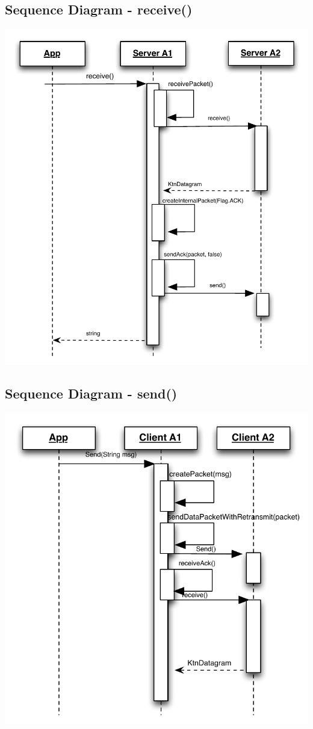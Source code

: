 \documentclass{article}
\begin{document}
\subsection{Sequence Diagram - receive()}
\includegraphics[scale=0.95]{ktnRecv.pdf}
\subsection{Sequence Diagram - send()}
\includegraphics[scale=0.95]{ktnSend.pdf}
\newpage
\end{document}
